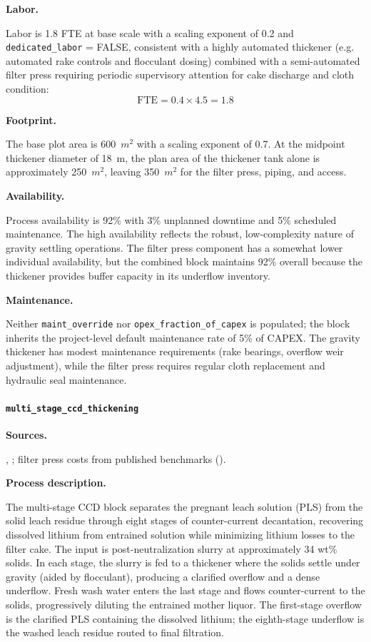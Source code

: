 \medskip
\noindent\textbf{Labor.}\quad

Labor is 1.8 FTE at base scale with a scaling exponent of 0.2 and \texttt{dedicated\_labor} = FALSE, consistent with a highly automated thickener (e.g. automated rake controls and flocculant dosing) combined with a semi-automated filter press requiring periodic supervisory attention for cake discharge and cloth condition:
\[
	\text{FTE} = 0.4 \times 4.5 = 1.8
\]

\medskip
\noindent\textbf{Footprint.}\quad

The base plot area is 600~$\si{m^2}$ with a scaling exponent of 0.7. At the midpoint thickener diameter of 18~m, the plan area of the thickener tank alone is approximately 250~$\si{m^2}$, leaving 350~$\si{m^2}$ for the filter press, piping, and access.

\medskip
\noindent\textbf{Availability.}\quad

Process availability is 92\% with 3\% unplanned downtime and 5\% scheduled maintenance. The high availability reflects the robust, low-complexity nature of gravity settling operations. The filter press component has a somewhat lower individual availability, but the combined block maintains 92\% overall because the thickener provides buffer capacity in its underflow inventory.

\medskip
\noindent\textbf{Maintenance.}\quad

Neither \texttt{maint\_override} nor \texttt{opex\_fraction\_of\_capex} is populated; the block inherits the project-level default maintenance rate of 5\% of CAPEX. The gravity thickener has modest maintenance requirements (rake bearings, overflow weir adjustment), while the filter press requires regular cloth replacement and hydraulic seal maintenance.

\clearpage
\paragraph{\texttt{multi\_stage\_ccd\_thickening}}\label{app:04-methods-blockdefs-ccd}

\medskip
\noindent\textbf{Sources.}\quad

\citet{sgscanadaincSK1300Technical2024}, \citet{mularCAPCOSTSHandbookEstimating1998}; filter press costs from published benchmarks (\citet{porvooIndustrialFilterPress2025}). 

\medskip
\noindent\textbf{Process description.}\quad

The multi-stage CCD block separates the pregnant leach solution (PLS) from the solid leach residue through eight stages of counter-current decantation, recovering dissolved lithium from entrained solution while minimizing lithium losses to the filter cake. The input is post-neutralization slurry at approximately 34 wt\% solids. In each stage, the slurry is fed to a thickener where the solids settle under gravity (aided by flocculant), producing a clarified overflow and a dense underflow. Fresh wash water enters the last stage and flows counter-current to the solids, progressively diluting the entrained mother liquor. The first-stage overflow is the clarified PLS containing the dissolved lithium; the eighth-stage underflow is the washed leach residue routed to final filtration.

